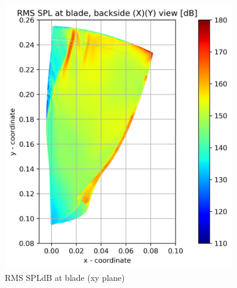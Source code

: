 \begin{figure}[ht]
	\centering
	\includegraphics[width=0.9\textwidth]{Figures/blade-xy-rms-spldb.png}
	\caption{RMS SPLdB at blade (xy plane)} \label{blade-xy-rms-spldb}
\end{figure}

